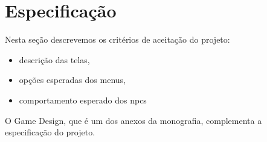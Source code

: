 \chapter{Especificação}

Nesta seção descrevemos os critérios de aceitação do projeto:
\begin{itemize}
\item descrição das telas,
\item opções esperadas dos menus,
\item comportamento esperado dos npcs
\end{itemize}

O Game Design, que é um dos anexos da monografia, complementa a
especificação do projeto.

